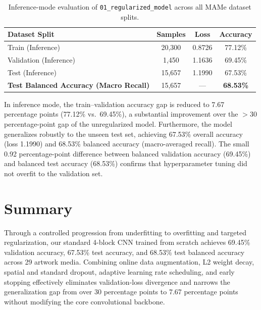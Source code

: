 \documentclass[11pt, a4paper]{article}
\begin{document}
\begin{table}[htbp]
\centering
\caption{Inference-mode evaluation of \texttt{01\_regularized\_model} across all MAMe dataset splits.}
\label{tab:split_eval}
\begin{tabular}{@{}lccc@{}}
\toprule
\textbf{Dataset Split} & \textbf{Samples} & \textbf{Loss} & \textbf{Accuracy} \\
\midrule
Train (Inference) & 20,300 & 0.8726 & 77.12\% \\
Validation (Inference) & 1,450 & 1.1636 & 69.45\% \\
Test (Inference) & 15,657 & 1.1990 & 67.53\% \\
\midrule
\textbf{Test Balanced Accuracy (Macro Recall)} & 15,657 & --- & \textbf{68.53\%} \\
\bottomrule
\end{tabular}
\end{table}

In inference mode, the train--validation accuracy gap is reduced to 7.67 percentage points (77.12\% vs.\ 69.45\%), a substantial improvement over the $>30$ percentage-point gap of the unregularized model. Furthermore, the model generalizes robustly to the unseen test set, achieving 67.53\% overall accuracy (loss 1.1990) and 68.53\% balanced accuracy (macro-averaged recall). The small 0.92 percentage-point difference between balanced validation accuracy (69.45\%) and balanced test accuracy (68.53\%) confirms that hyperparameter tuning did not overfit to the validation set.

\section{Summary}

Through a controlled progression from underfitting to overfitting and targeted regularization, our standard 4-block CNN trained from scratch achieves 69.45\% validation accuracy, 67.53\% test accuracy, and 68.53\% test balanced accuracy across 29 artwork media. Combining online data augmentation, L2 weight decay, spatial and standard dropout, adaptive learning rate scheduling, and early stopping effectively eliminates validation-loss divergence and narrows the generalization gap from over 30 percentage points to 7.67 percentage points without modifying the core convolutional backbone.
\end{document}

